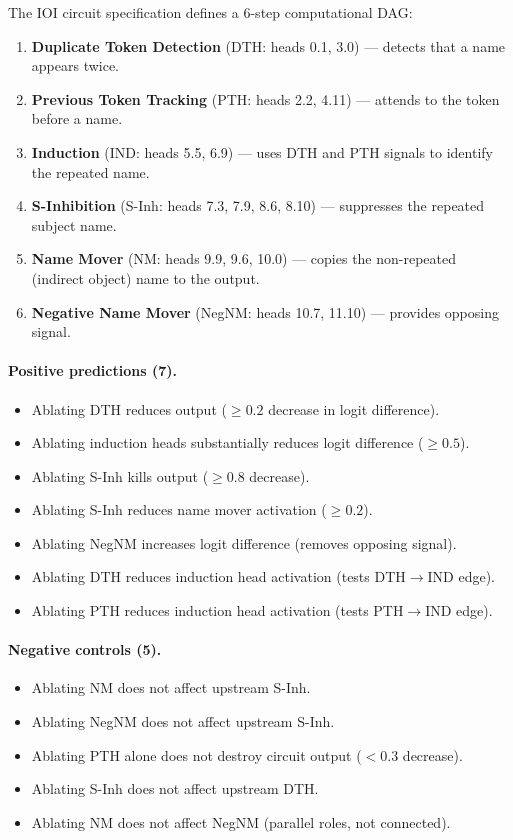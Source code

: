 \documentclass{article}
\begin{document}
The IOI circuit specification defines a 6-step computational DAG:

\begin{enumerate}[nosep]
    \item \textbf{Duplicate Token Detection} (DTH: heads 0.1, 3.0) --- detects that a name appears twice.
    \item \textbf{Previous Token Tracking} (PTH: heads 2.2, 4.11) --- attends to the token before a name.
    \item \textbf{Induction} (IND: heads 5.5, 6.9) --- uses DTH and PTH signals to identify the repeated name.
    \item \textbf{S-Inhibition} (S-Inh: heads 7.3, 7.9, 8.6, 8.10) --- suppresses the repeated subject name.
    \item \textbf{Name Mover} (NM: heads 9.9, 9.6, 10.0) --- copies the non-repeated (indirect object) name to the output.
    \item \textbf{Negative Name Mover} (NegNM: heads 10.7, 11.10) --- provides opposing signal.
\end{enumerate}

\paragraph{Positive predictions (7).}
\begin{itemize}[nosep]
    \item Ablating DTH reduces output ($\geq 0.2$ decrease in logit difference).
    \item Ablating induction heads substantially reduces logit difference ($\geq 0.5$).
    \item Ablating S-Inh kills output ($\geq 0.8$ decrease).
    \item Ablating S-Inh reduces name mover activation ($\geq 0.2$).
    \item Ablating NegNM increases logit difference (removes opposing signal).
    \item Ablating DTH reduces induction head activation (tests DTH$\rightarrow$IND edge).
    \item Ablating PTH reduces induction head activation (tests PTH$\rightarrow$IND edge).
\end{itemize}

\paragraph{Negative controls (5).}
\begin{itemize}[nosep]
    \item Ablating NM does not affect upstream S-Inh.
    \item Ablating NegNM does not affect upstream S-Inh.
    \item Ablating PTH alone does not destroy circuit output ($< 0.3$ decrease).
    \item Ablating S-Inh does not affect upstream DTH.
    \item Ablating NM does not affect NegNM (parallel roles, not connected).
\end{itemize}
\end{document}
